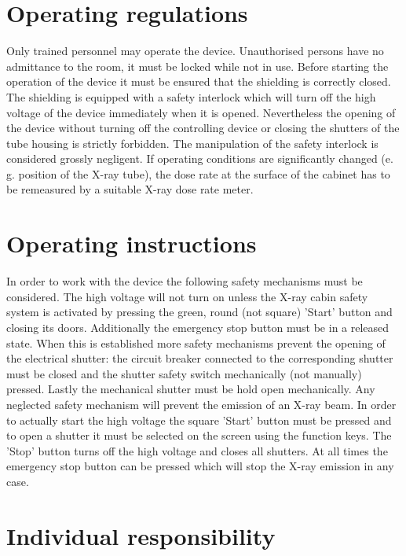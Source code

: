\documentclass[a4paper,12pt,twoside]{article}
\begin{document}
\begin{appendices}
\section*{Operating regulations}

Only trained personnel may operate the device. Unauthorised persons have no admittance to the room, it must be locked while not in use. Before starting the operation of the device it must be ensured that the shielding is correctly closed. The shielding is equipped with a safety interlock which will turn off the high voltage of the device immediately when it is opened. Nevertheless the opening of the device without turning off the controlling device or closing the shutters of the tube housing is strictly forbidden. The manipulation of the safety interlock is considered grossly negligent. If operating conditions are significantly changed (e. g. position of the X-ray tube), the dose rate at the surface of the cabinet has to be remeasured by a suitable X-ray dose rate meter.

\newpage 
\section*{Operating instructions}

In order to work with the device the following safety mechanisms must be considered. The high voltage will not turn on unless the X-ray cabin safety system is activated by pressing the green, round (not square) 'Start' button and closing its doors. Additionally the emergency stop button must be in a released state. When this is established more safety mechanisms prevent the opening of the electrical shutter: the circuit breaker connected to the corresponding shutter must be closed and the shutter safety switch mechanically (not manually) pressed. Lastly the mechanical shutter must be hold open mechanically. Any neglected safety mechanism will prevent the emission of an X-ray beam. In order to actually start the high voltage the square 'Start' button must be pressed and to open a shutter it must be selected on the screen using the function keys. The 'Stop' button turns off the high voltage and closes all shutters. At all times the emergency stop button can be pressed which will stop the X-ray emission in any case.

\section*{Individual responsibility}


\end{appendices}
\end{document}
